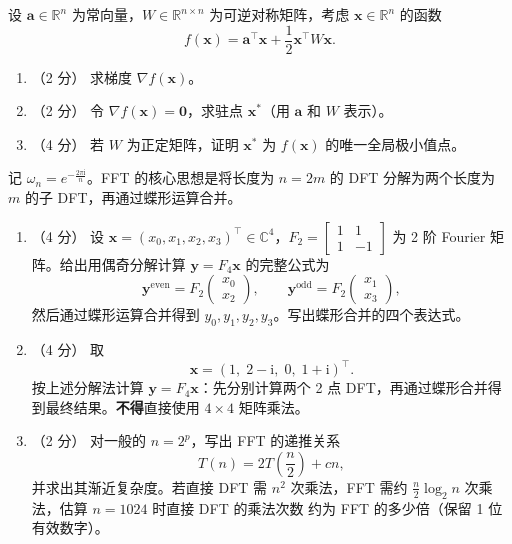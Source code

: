 \documentclass[11pt,a4paper]{exam-zh}
\newcommand{\bvec}[1]{\boldsymbol{#1}}
\newcommand{\R}{\mathbb{R}}
\newcommand{\C}{\mathbb{C}}
\begin{document}
\begin{problem}[points = 8]
设 $\bvec{a} \in \R^n$ 为常向量，$W \in \R^{n \times n}$ 为可逆对称矩阵，考虑 $\bvec{x} \in \R^n$ 的函数
\[
f\left(\bvec{x}\right) = \bvec{a}^\top \bvec{x} + \frac12\bvec{x}^\top W \bvec{x}.
\]
\begin{enumerate}
    \item （2 分） 求梯度 $\nabla f(\bvec{x})$。

    \item （2 分） 令 $\nabla f(\bvec{x}) = \bvec{0}$，求驻点 $\bvec{x}^*$（用 $\bvec{a}$ 和 $W$ 表示）。

    \item （4 分） 若 $W$ 为正定矩阵，证明 $\bvec{x}^*$ 为 $f(\bvec{x})$ 的唯一全局极小值点。
\end{enumerate}
\end{problem}


\begin{problem}[points = 10]

记 $\omega_n = e^{-\frac{2\pi \mathrm{i}}{n}}$。FFT 的核心思想是将长度为 $n=2m$ 的 DFT 分解为两个长度为 $m$ 的子 DFT，再通过蝶形运算合并。

\begin{enumerate}
    \item （4 分） 设 $\bvec{x} = (x_0, x_1, x_2, x_3)^\top \in \C^4$，$F_2 = \begin{bmatrix} 1 & 1 \\ 1 & -1 \end{bmatrix}$ 为 2 阶 Fourier 矩阵。给出用偶奇分解计算 $\bvec{y} = F_4 \bvec{x}$ 的完整公式为
    \[
    \bvec{y}^{\text{even}} = F_2\begin{pmatrix} x_0 \\ x_2 \end{pmatrix}, \qquad
    \bvec{y}^{\text{odd}} = F_2\begin{pmatrix} x_1 \\ x_3 \end{pmatrix},
    \]
    然后通过蝶形运算合并得到 $y_0, y_1, y_2, y_3$。写出蝶形合并的四个表达式。

    \item （4 分） 取 $$\bvec{x} = (1,\; 2-\mathrm{i},\; 0,\; 1+\mathrm{i})^\top.$$
    按上述分解法计算 $\bvec{y} = F_4\bvec{x}$：先分别计算两个 2 点 DFT，再通过蝶形合并得到最终结果。\textbf{不得}直接使用 $4\times4$ 矩阵乘法。

    \item （2 分） 对一般的 $n = 2^p$，写出 FFT 的递推关系
    \[
    T(n)=2T\left(\frac n2\right)+cn,
    \]
    并求出其渐近复杂度。若直接 DFT 需 $n^2$ 次乘法，FFT 需约
    $\frac n2\log_2 n$ 次乘法，估算 $n=1024$ 时直接 DFT 的乘法次数
    约为 FFT 的多少倍（保留 1 位有效数字）。
\end{enumerate}
\end{problem}
\end{document}
